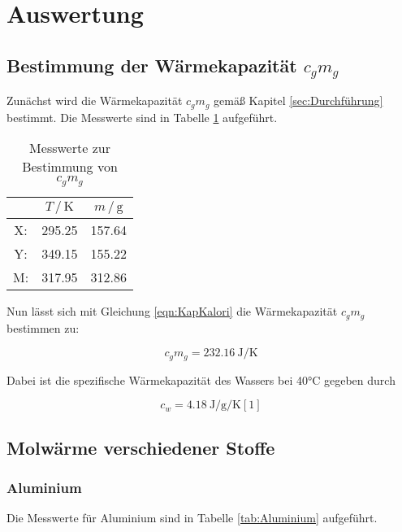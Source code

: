 \section{Auswertung}
\label{sec:Auswertung}


\subsection {Bestimmung der Wärmekapazität $c_g m_g$}

Zunächst wird die Wärmekapazität $c_g m_g$ gemäß Kapitel \ref{sec:Durchführung}
bestimmt. Die Messwerte sind in Tabelle \ref{tab:Kalorimeter} aufgeführt.

\begin{table}
\centering
\caption{Messwerte zur Bestimmung von $c_g m_g$}
\label{tab:Kalorimeter}
\begin{tabular}{c c c}
\toprule
$ $ & $T \,/\, \si{\kelvin}$& $m \,/\, \si{\gram}$\\
\midrule
X: & 295.25 & 157.64\\
Y: & 349.15 & 155.22\\
M: & 317.95 & 312.86\\
\bottomrule
\end{tabular}
\end{table}

Nun lässt sich mit Gleichung \eqref{eqn:KapKalori} die Wärmekapazität $c_g m_g$ 
bestimmen zu: 

\begin{equation*}
c_g m_g = \SI{232.16}{\joule\per\kelvin}
\end{equation*}

Dabei ist die spezifische Wärmekapazität des Wassers bei 40°C gegeben durch

\begin{equation}
c_w = \SI{4.18}{\joule\per\gram\per\kelvin} [1]
\end{equation}

\subsection{Molwärme verschiedener Stoffe}

\subsubsection{Aluminium}

Die Messwerte für Aluminium sind in Tabelle \ref{tab:Aluminium} aufgeführt.

